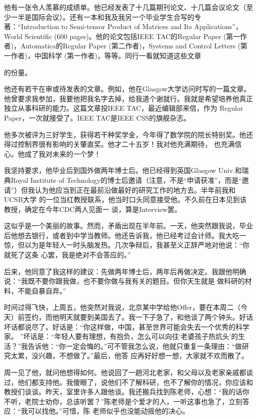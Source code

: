 \documentclass{article}
\begin{document}
他有一张令人羡慕的成绩单。他已经发表了十几篇期刊论文、十几篇会议论文（至少一半是国际会议）。还有一本和我及我另一个毕业学生合写的专著：“Introduction to Semi-tensor Product of Matrices and Its Applications”，World Scientific (600 pages)。他的论文包括IEEE TAC的Regular Paper (第一作者)，Automatica的Regular Paper (第二作者)，Systems and Control Letters (第一作者)，中国科学 (第一作者)，等等。同行一看就知道这些文章
\newpage

的份量。 

他还有若干在审或待发表的文章。例如，他在Glasgow大学访问时写的一篇文章。他曾要求我参加，我要他把我名字去掉，给我道个谢就行。我就是希望培养他真正独立从事科研的能力。这篇文章投IEEE TAC，最近编辑部来信，作为 Regular Paper，一次就接受了。IEEE
 TAC是IEEE CSS的旗舰杂志。 

他多次被评为三好学生，获得若干种奖学金，今年得了数学院的院长特别奖。他还得过控制界很有影响的关肇直奖。他才二十五岁！我对他充满期待，
也充满信心。他成了我对未来的一个梦！ 

我坚持要求，他毕业后到国外做两年博士后。他已经得到英国Glasgow Univ.和瑞典Royal Institute of Technology的博士后邀请（注意，不是“申请获准”，而是“邀请”）但我认为他应当到正在最前沿做最好的研究工作的地方去。半年前我和UCSB大学
\newpage
的一位当红教授联系，他当时口头同意接受他。不久前在日本见到该教授，确定在今年CDC两人见面一
谈，算是Interview罢。 

这似乎是一个美丽的故事。然而，矛盾出现在半年前。一天，他突然跟我说，毕业后他想去银行，或者到中学当教师。他还告诉我，他已经考过会计师。我大吃一惊，但以为是年轻人一时头脑发热。几次争辩后，我甚至义正辞严地对他说：“你就死了这条
心罢，我是绝对不会答应的。” 

后来，他同意了我这样的建议：先做两年博士后，两年后再做决定。我跟他明确说：“我既不要你跟我做，也不要你做与我有关的题目。但你天生就是
做科研的材料，不能自暴自弃。” 

时间过得飞快，上周五，他突然对我说，北京某中学给他Offer，要在本周二（今天）前签约，而他明天就要到美国去了。我一下子急了，和他谈了两个钟头。好话坏话都说尽了。好话是：“你这样做，中国，甚至世界可能会失去一个优秀的科学家。
\newpage
”坏话是：“年轻人要有理想，有抱负，怎么可以向往‘老婆孩子热炕头’的生活？”我告诉他：“你一定会悔的。”可不管我怎么说，他就只重复一条理由：“做研究太累，没兴趣，不想做了。”最后，他答
应再好好想一想，大家就不欢而散了。 

周一见了他，就问他想得如何。他说回了一趟河北老家，和父母以及老家亲戚都谈过，他们都支持他。我傻眼了，说他们不了解科研，也不了解你的情况，你应该和教授们谈谈。昨天，室里许多人跟他谈。我还搬兵找到陈老师，心想：“我的话你不听，老院士劝你，总该听罢？”陈老师是个爱才的人，一听这事也急了，立刻答应：“我可以找他。”可惜，陈
老师似乎也没能动摇他的决心。 
\end{document}

